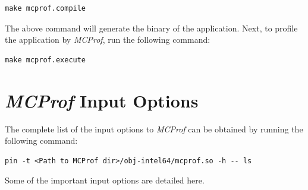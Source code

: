 \documentclass[11pt]{article}
\newcommand{\MCPROF}{\emph{MCProf}}
\begin{document}
{
\small
\begin{Verbatim}[frame=single]
make mcprof.compile
\end{Verbatim}
}

The above command will generate the binary of the application. Next, to profile
the application by \MCPROF{}, run the following command:

{
\small
\begin{Verbatim}[frame=single]
make mcprof.execute
\end{Verbatim}
}


\section{\MCPROF{} Input Options}
\label{sec:inputopt}

The complete list of the input options to \MCPROF{} can be obtained by running
the following command:

{
\small
\begin{Verbatim}[frame=single]
pin -t <Path to MCProf dir>/obj-intel64/mcprof.so -h -- ls
\end{Verbatim}
}

Some of the important input options are detailed here.
\end{document}

